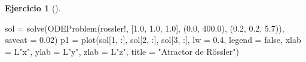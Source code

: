 \documentclass[
  spanish,
  a4paper,
]{scrreport}
\newenvironment{Shaded}{\begin{snugshade}}{\end{snugshade}}
\newcommand{\ConstantTok}[1]{\textcolor[rgb]{0.56,0.35,0.01}{#1}}
\newcommand{\FloatTok}[1]{\textcolor[rgb]{0.68,0.00,0.00}{#1}}
\newcommand{\FunctionTok}[1]{\textcolor[rgb]{0.28,0.35,0.67}{#1}}
\newcommand{\NormalTok}[1]{\textcolor[rgb]{0.00,0.23,0.31}{#1}}
\newcommand{\OperatorTok}[1]{\textcolor[rgb]{0.37,0.37,0.37}{#1}}
\newcommand{\StringTok}[1]{\textcolor[rgb]{0.13,0.47,0.30}{#1}}
\theoremstyle{definition}
\newtheorem{exercise}{Ejercicio}[chapter]
\theoremstyle{remark}
\begin{document}
\begin{exercise}[]
\begin{tcolorbox}
\begin{Shaded}
\begin{Highlighting}[]
\NormalTok{sol }\OperatorTok{=} \FunctionTok{solve}\NormalTok{(}\FunctionTok{ODEProblem}\NormalTok{(rossler!, [}\FloatTok{1.0}\NormalTok{, }\FloatTok{1.0}\NormalTok{, }\FloatTok{1.0}\NormalTok{], (}\FloatTok{0.0}\NormalTok{, }\FloatTok{400.0}\NormalTok{), (}\FloatTok{0.2}\NormalTok{, }\FloatTok{0.2}\NormalTok{, }\FloatTok{5.7}\NormalTok{)),}
\NormalTok{            saveat }\OperatorTok{=} \FloatTok{0.02}\NormalTok{)}
\NormalTok{p1 }\OperatorTok{=} \FunctionTok{plot}\NormalTok{(sol[}\FloatTok{1}\NormalTok{, }\OperatorTok{:}\NormalTok{], sol[}\FloatTok{2}\NormalTok{, }\OperatorTok{:}\NormalTok{], sol[}\FloatTok{3}\NormalTok{, }\OperatorTok{:}\NormalTok{], lw }\OperatorTok{=} \FloatTok{0.4}\NormalTok{, legend }\OperatorTok{=} \ConstantTok{false}\NormalTok{,}
\NormalTok{    xlab }\OperatorTok{=}\NormalTok{ L}\StringTok{"x"}\NormalTok{, ylab }\OperatorTok{=}\NormalTok{ L}\StringTok{"y"}\NormalTok{, zlab }\OperatorTok{=}\NormalTok{ L}\StringTok{"z"}\NormalTok{, title }\OperatorTok{=} \StringTok{"Atractor de Rössler"}\NormalTok{)}


\end{Highlighting}
\end{Shaded}
\end{tcolorbox}
\end{exercise}
\end{document}
